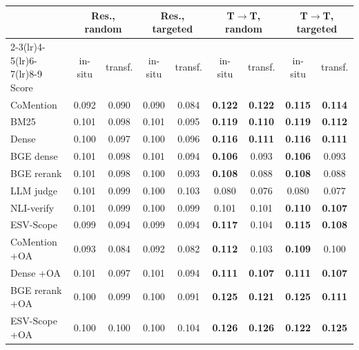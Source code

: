 \setlength{\tabcolsep}{2pt}
\begin{tabular}{lcccccccc}
\toprule
 & \multicolumn{2}{c}{Res., random} & \multicolumn{2}{c}{Res., targeted} & \multicolumn{2}{c}{T$\to$T, random} & \multicolumn{2}{c}{T$\to$T, targeted} \\
\cmidrule(lr){2-3}\cmidrule(lr){4-5}\cmidrule(lr){6-7}\cmidrule(lr){8-9}
Score & in-situ & transf. & in-situ & transf. & in-situ & transf. & in-situ & transf. \\
\midrule
CoMention & 0.092 & 0.090 & 0.090 & 0.084 & \textbf{0.122} & \textbf{0.122} & \textbf{0.115} & \textbf{0.114} \\
BM25 & 0.101 & 0.098 & 0.101 & 0.095 & \textbf{0.119} & \textbf{0.110} & \textbf{0.119} & \textbf{0.112} \\
Dense & 0.100 & 0.097 & 0.100 & 0.096 & \textbf{0.116} & \textbf{0.111} & \textbf{0.116} & \textbf{0.111} \\
BGE dense & 0.101 & 0.098 & 0.101 & 0.094 & \textbf{0.106} & 0.093 & \textbf{0.106} & 0.093 \\
BGE rerank & 0.101 & 0.098 & 0.100 & 0.093 & \textbf{0.108} & 0.088 & \textbf{0.108} & 0.088 \\
LLM judge & 0.101 & 0.099 & 0.100 & 0.103 & 0.080 & 0.076 & 0.080 & 0.077 \\
NLI-verify & 0.101 & 0.099 & 0.100 & 0.099 & 0.101 & 0.101 & \textbf{0.110} & \textbf{0.107} \\
ESV-Scope & 0.099 & 0.094 & 0.099 & 0.094 & \textbf{0.117} & 0.104 & \textbf{0.115} & \textbf{0.108} \\
\midrule
CoMention +OA & 0.093 & 0.084 & 0.092 & 0.082 & \textbf{0.112} & 0.103 & \textbf{0.109} & 0.100 \\
Dense +OA & 0.101 & 0.097 & 0.101 & 0.094 & \textbf{0.111} & \textbf{0.107} & \textbf{0.111} & \textbf{0.107} \\
BGE rerank +OA & 0.100 & 0.099 & 0.100 & 0.091 & \textbf{0.125} & \textbf{0.121} & \textbf{0.125} & \textbf{0.111} \\
ESV-Scope +OA & 0.100 & 0.100 & 0.100 & 0.104 & \textbf{0.126} & \textbf{0.126} & \textbf{0.122} & \textbf{0.125} \\
\bottomrule
\end{tabular}
